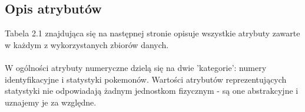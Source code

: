\documentclass[12pt, a4paper]{report}
\renewcommand{\figurename}{Rys}
\begin{document}
\subsection{Opis atrybutów}
Tabela 2.1 znajdująca się na następnej stronie opisuje wszystkie atrybuty zawarte w każdym z wykorzystanych zbiorów danych.\\\\ \noindent
W ogólności atrybuty numeryczne dzielą się na dwie 'kategorie': numery identyfikacyjne i statystyki pokemonów. Wartości atrybutów reprezentujących statystyki nie odpowiadają żadnym jednostkom fizycznym - są one abstrakcyjne i uznajemy je za względne.\\

\renewcommand{\figurename}{Tabela.}
\end{document}
